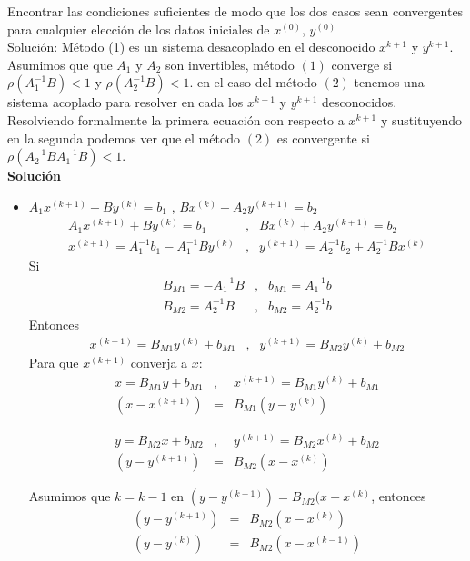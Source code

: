 Encontrar las condiciones suficientes de modo que los dos casos sean convergentes para cualquier elección de los datos iniciales de $x^{(0)}$,  $y^{(0)}$\\
Solución: Método (1) es un sistema desacoplado en el desconocido $x^{k+1}$ y $y^{k+1}$. Asumimos que que $A_1$ y $A_2$ son invertibles, método $(1)$ converge si $ \rho (A_1^{-1}B) < 1 $ y $\rho (A_2^{-1}B) < 1 $. en el caso del método $(2)$ tenemos una sistema acoplado para resolver en cada los $x^{k+1}$ y $y^{k+1}$ desconocidos. Resolviendo formalmente la primera ecuación con respecto a $x^{k+1}$  y sustituyendo en la segunda podemos ver que el método $(2)$ es convergente si $\rho (A_2^{-1}BA_1^{-1}B) < 1 $. \\
\textbf{Solución}\\
\begin{itemize}
    \item $ A_{1}x^{(k + 1)} + By^{(k)} =  b_{1}$ , $Bx^{(k)} + A_{2}y^{(k + 1)} =  b_{2}$ 
    \begin{eqnarray*}
        A_{1}x^{(k + 1)} + By^{(k)} =  b_{1} & , & Bx^{(k)} + A_{2}y^{(k + 1)} =  b_{2}\\
        x^{(k + 1)}  =  A_{1}^{-1}b_{1} - A_{1}^{-1}By^{(k)}& , & y^{(k + 1)} =  A_{2}^{-1}b_{2} + A_{2}^{-1}Bx^{(k)}
    \end{eqnarray*} 
    Si 
    \begin{eqnarray*}
        B_{M1} = -A_{1}^{-1}B & , & b_{M1} =  A_{1}^{-1}b\\
        B_{M2} = A_{2}^{-1}B & , & b_{M2} =  A_{2}^{-1}b
    \end{eqnarray*} 
    Entonces
    \begin{eqnarray*}
        x^{(k + 1)} = B_{M1}y^{(k)} + b_{M1} & , & y^{(k + 1)} = B_{M2}y^{(k)} + b_{M2}
    \end{eqnarray*} 
    Para que $x^{(k + 1)}$ converja a $x$:
    \begin{eqnarray*}
        x = B_{M1}y + b_{M1} & , & x^{(k + 1)} = B_{M1}y^{(k)} + b_{M1}\\
        (x - x^{(k + 1)}) & = &  B_{M1}(y - y^{(k)})
    \end{eqnarray*} 
    
    \begin{eqnarray*}
        y = B_{M2}x + b_{M2} & , & y^{(k + 1)} = B_{M2}x^{(k)} + b_{M2}\\
        (y - y^{(k + 1)}) & = &  B_{M2}(x - x^{(k)})
    \end{eqnarray*} 
    
    Asumimos que $k = k - 1$ en $(y - y^{(k + 1)}) = B_{M2}(x - x^{(k)}$, entonces 
     \begin{eqnarray*}
        (y - y^{(k + 1)}) & = &  B_{M2}(x - x^{(k)})\\
        (y - y^{(k)}) & = &  B_{M2}(x - x^{(k - 1)})
    \end{eqnarray*} 
    

\end{itemize}

